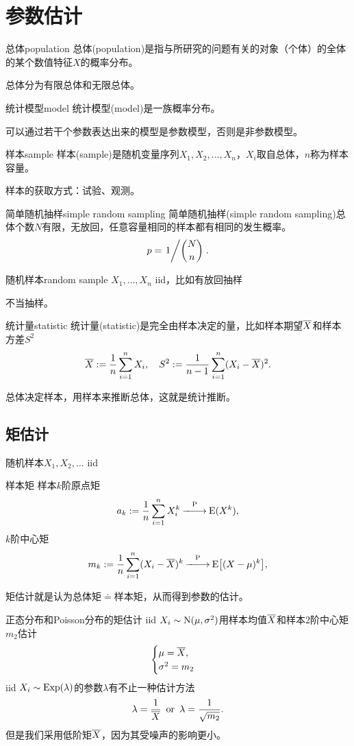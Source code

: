 \chapter{参数估计}

\begin{definition}{总体}{population}
	总体(population)是指与所研究的问题有关的对象（个体）的全体的某个数值特征$X$的概率分布。
\end{definition}
总体分为有限总体和无限总体。
\begin{definition}{统计模型}{model}
	统计模型(model)是一族概率分布。
\end{definition}
可以通过若干个参数表达出来的模型是参数模型，否则是非参数模型。
\begin{definition}{样本}{sample}
	样本(sample)是随机变量序列$X_1,X_2,\ldots,X_n$，$X_i$取自总体，$n$称为样本容量。
\end{definition}
样本的获取方式：试验、观测。
\begin{definition}{简单随机抽样}{simple random sampling}
	简单随机抽样(simple random sampling)总体个数$N$有限，无放回，任意容量相同的样本都有相同的发生概率。
	\[
		p=\left.{1}\middle/{\binom Nn}\right..
	\]
\end{definition}
\begin{definition}{随机样本}{random sample}
	$X_1,\ldots,X_n$ iid，比如有放回抽样
\end{definition}
不当抽样。
\begin{definition}{统计量}{statistic}
	统计量(statistic)是完全由样本决定的量，比如样本期望$\overline{X}$和样本方差$S^2$
	\[
		\overline{X}:=\frac1n\sum_{i=1}^nX_i,\quad S^2:=\frac1{n-1}\sum_{i=1}^n(X_i-\overline{X})^2.
	\]
\end{definition}
总体决定样本，用样本来推断总体，这就是统计推断。
\section{矩估计}
随机样本$X_1,X_2,\ldots$ iid
\begin{definition}{样本矩}{}
	样本$k$阶原点矩
	\[
		a_k:=\frac1n\sum_{i=1}^nX_i^k\overset{\operatorname{P}}{-\hspace{-4pt}-\hspace{-5pt}\longrightarrow}\operatorname{E}(X^k),
	\]
	$k$阶中心矩
	\[
		m_k:=\frac1n\sum_{i=1}^n(X_i-\overline{X})^k\overset{\operatorname{P}}{-\hspace{-4pt}-\hspace{-5pt}\longrightarrow}\operatorname{E}\bigl[(X-\mu)^k\bigr],
	\]
\end{definition}
矩估计就是认为总体矩$\doteq$样本矩，从而得到参数的估计。
\begin{example}{正态分布和Poisson分布的矩估计}{}
	iid $X_i\sim\operatorname{N}(\mu,\sigma^2)$用样本均值$\overline{X}$和样本2阶中心矩$m_2$估计
	\begin{align*}
		\begin{cases}
			\mu=\overline{X},\\
			\sigma^2=m_2
		\end{cases}
	\end{align*}
	\tcblower
	iid $X_i\sim\operatorname{Exp}(\lambda)$的参数$\lambda$有不止一种估计方法
	\begin{align*}
		\lambda=\frac1{\overline{X}}\enspace\text{or}\enspace\lambda=\frac1{\sqrt{m_2}}.
	\end{align*}
	但是我们采用低阶矩$\overline{X}$，因为其受噪声的影响更小。
\end{example}
